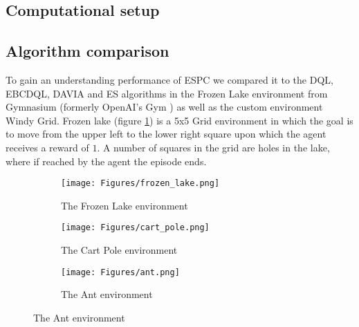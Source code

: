 \subsection{Computational setup}

\subsection{Algorithm comparison}
To gain an understanding performance of ESPC we compared it to the DQL, EBCDQL, DAVIA and ES algorithms in the Frozen Lake environment from Gymnasium (formerly OpenAI's Gym \cite{Gym}) as well as the custom environment Windy Grid. Frozen lake (figure \ref{fig:FrozenLake}) is a 5x5 Grid environment in which the goal is to move from the upper left to the lower right square upon which the agent receives a reward of $1$. A number of squares in the grid are holes in the lake, where if reached by the agent the episode ends. 

\begin{figure}
    \centering
    \begin{subfigure}{0.4\textwidth}
        \centering
        \texttt{[image: Figures/frozen\_lake.png]}
        \caption{The Frozen Lake environment}
        \label{fig:FrozenLake}
    \end{subfigure}
    \begin{subfigure}{0.4\textwidth}
        \centering
        \texttt{[image: Figures/cart\_pole.png]}
        \caption{The Cart Pole environment}
        \label{fig:CartPole}
    \end{subfigure}
    \begin{subfigure}{0.5\textwidth}
        \centering
        \texttt{[image: Figures/ant.png]}
        \caption{The Ant environment}
        \label{fig:Ant}
    \end{subfigure}
\end{figure}

